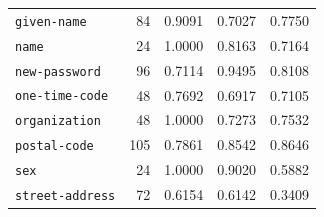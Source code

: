 \begin{longtable}{lrrrr}
\texttt{given-name} & 84 & 0.9091 & 0.7027 & 0.7750 \\  %
\texttt{name} & 24 & 1.0000 & 0.8163 & 0.7164 \\  %
\texttt{new-password} & 96 & 0.7114 & 0.9495 & 0.8108 \\  %
\texttt{one-time-code} & 48 & 0.7692 & 0.6917 & 0.7105 \\  %
\texttt{organization} & 48 & 1.0000 & 0.7273 & 0.7532 \\  %
\texttt{postal-code} & 105 & 0.7861 & 0.8542 & 0.8646 \\  %
\texttt{sex} & 24 & 1.0000 & 0.9020 & 0.5882 \\  %
\texttt{street-address} & 72 & 0.6154 & 0.6142 & 0.3409 \\  %

\end{longtable}
